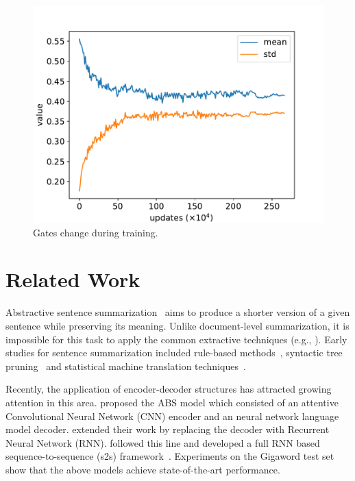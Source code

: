 \documentclass[letterpaper]{article} %
\begin{document}
	\begin{figure}
		\centering
		\includegraphics[width=0.7\linewidth]{gate_change}
		\caption{Gates change during training.}
		\label{fig:gate_change}
	\end{figure}
	
	
	\section{Related Work}
	Abstractive sentence summarization~\cite{chopra2016abstractive} aims to produce a shorter version of a given sentence while preserving its meaning.
	Unlike document-level summarization, it is impossible for this task to apply the common extractive techniques (e.g., \cite{cao2015ranking,cao2015learning}).
	Early studies for sentence summarization included rule-based methods~\cite{zajic2007multi}, syntactic tree pruning~\cite{knight2002summarization} and statistical machine translation techniques~\cite{banko2000headline}. 
	
	Recently, the application of encoder-decoder structures has attracted growing attention in this area.
	\cite{rush2015neural} proposed the ABS model which consisted of an attentive Convolutional Neural Network (CNN) encoder and an neural network language model decoder.
	\cite{chopra2016abstractive} extended their work by replacing the decoder with Recurrent Neural Network (RNN).
	\cite{nallapati2016abstractive} followed this line and developed a full RNN based sequence-to-sequence (s2s) framework~\cite{sutskever2014sequence}.
	Experiments on the Gigaword test set~\cite{rush2015neural} show that the above models achieve state-of-the-art performance.
	
\end{document}
